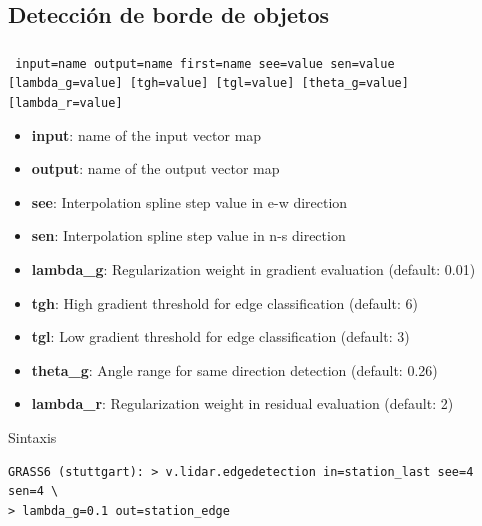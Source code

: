 \subsection{Detección de borde de objetos}
\begin{frame}[fragile,shrink=10]
  \frametitle{}
  \begin{beamerboxesrounded}[shadow=true]{\textbf{}
    \texttt{ input=name output=name first=name see=value sen=value 
    [lambda\_g=value] [tgh=value] [tgl=value] [theta\_g=value] [lambda\_r=value]}}
   \begin{itemize}
    \item \textbf{input}: name of the input vector map
    \item \textbf{output}: name of the output vector map
    \item \textbf{see}: Interpolation spline step value in e-w direction
    \item \textbf{sen}: Interpolation spline step value in n-s direction
    \item \textbf{lambda\_g}: Regularization weight in gradient evaluation (default: 0.01)
    \item \textbf{tgh}: High gradient threshold for edge classification (default: 6)
    \item \textbf{tgl}: Low gradient threshold for edge classification (default: 3)
    \item \textbf{theta\_g}: Angle range for same direction detection (default: 0.26)
    \item \textbf{lambda\_r}: Regularization weight in residual evaluation (default: 2)
   \end{itemize}
  \end{beamerboxesrounded}
 \pause
 \begin{beamerboxesrounded}[shadow=true]{Sintaxis}
\scriptsize
\begin{verbatim}
GRASS6 (stuttgart): > v.lidar.edgedetection in=station_last see=4 sen=4 \
> lambda_g=0.1 out=station_edge
\end{verbatim}
\end{beamerboxesrounded}
\end{frame}
\pgfdeclareimage[width=0.65\textwidth]{edge}{images/edge}
